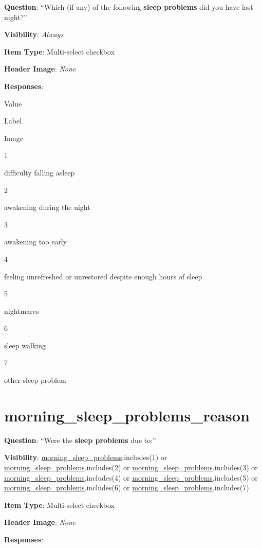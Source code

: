 \documentclass[]{book}
\begin{document}
\textbf{Question}: ``Which (if any) of the following \textbf{sleep problems} did you have last night?''

\textbf{Visibility}: \emph{Always}

\textbf{Item Type}: Multi-select checkbox

\textbf{Header Image}: \emph{None}

\textbf{Responses}:

Value

Label

Image

1

difficulty falling asleep

2

awakening during the night

3

awakening too early

4

feeling unrefreshed or unrestored despite enough hours of sleep

5

nightmares

6

sleep walking

7

other sleep problem

\hypertarget{morning_sleep_problems_reason}{%
\section{morning\_sleep\_problems\_reason}\label{morning_sleep_problems_reason}}

\textbf{Question}: ``Were the \textbf{sleep problems} due to:''

\textbf{Visibility}: \protect\hyperlink{morning_sleep_problems}{morning\_sleep\_problems}.includes(1) or \protect\hyperlink{morning_sleep_problems}{morning\_sleep\_problems}.includes(2) or \protect\hyperlink{morning_sleep_problems}{morning\_sleep\_problems}.includes(3) or \protect\hyperlink{morning_sleep_problems}{morning\_sleep\_problems}.includes(4) or \protect\hyperlink{morning_sleep_problems}{morning\_sleep\_problems}.includes(5) or \protect\hyperlink{morning_sleep_problems}{morning\_sleep\_problems}.includes(6) or \protect\hyperlink{morning_sleep_problems}{morning\_sleep\_problems}.includes(7)

\textbf{Item Type}: Multi-select checkbox

\textbf{Header Image}: \emph{None}

\textbf{Responses}:
\end{document}
